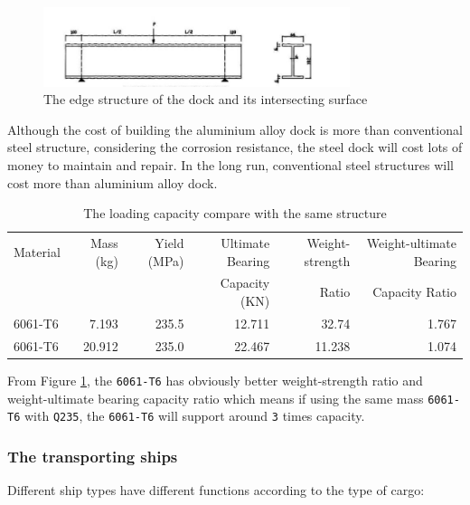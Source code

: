 \documentclass[11pt]{article}
\numberwithin{equation}{section}
\begin{document}
\begin{figure}[H]
\centering
\includegraphics[width=0.8\textwidth]{Figures/constructing_structure2.jpg}
\caption{\label{constructing_structure2}The edge structure of the dock and its intersecting surface}
\end{figure}

Although the cost of building the aluminium alloy dock is more than conventional steel structure, considering the corrosion resistance, the steel dock will cost lots of money to maintain and repair. In the long run, conventional steel structures will cost more than aluminium alloy dock.

\begin{table}[H]
\caption{\label{The_loading_capacity_compare_with_the_same_structure}The loading capacity compare with the same structure \cite{10.2749/101686606778995164}}
\centering
\begin{tabular}{lrrrrr}
\toprule
Material & Mass (kg) & Yield (MPa) & Ultimate Bearing & Weight-strength & Weight-ultimate Bearing\\
 &  &  & Capacity (KN) & Ratio & Capacity Ratio\\
\midrule
6061-T6 & 7.193 & 235.5 & 12.711 & 32.74 & 1.767\\
6061-T6 & 20.912 & 235.0 & 22.467 & 11.238 & 1.074\\
\bottomrule
\end{tabular}
\end{table}

From Figure \ref{The_loading_capacity_compare_with_the_same_structure}, the \texttt{6061-T6} has obviously better weight-strength ratio and weight-ultimate bearing capacity  ratio which means if using the same mass \texttt{6061-T6} with \texttt{Q235}, the \texttt{6061-T6} will support around \texttt{3} times capacity.

\subsubsection{The transporting ships}
\label{sec:org6ab5d6b}
Different ship types have different functions according to the type of cargo:
\end{document}
